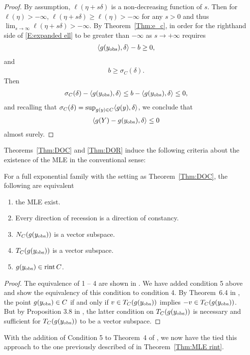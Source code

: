 \begin{proof}
By assumption, $\ell(\eta + s\delta)$ is a non-decreasing function of $s$.  
Then for $\ell(\eta ) > -\infty$, $\ell(\eta + s\delta) \geq \ell(\eta )  > -\infty$
for any $s>0$ and thus $\lim_{s \to \infty} \ell(\eta+s\delta) > -\infty$.
By Theorem~\ref{Thm:e_c}, in order for the righthand side of \eqref{E:expanded ell} 
to be greater than $-\infty$ as $s \to +\infty$ requires
\begin{align*}
	\langle g(y_{\text{obs}}), \delta \rangle - b \geq 0,
\end{align*}
and
\begin{align*}
	b \geq \sigma_C(\delta). %
\end{align*}
Then
\begin{align*}
	\sigma_C(\delta)  - \langle g(y_{\text{obs}}), \delta \rangle \leq b - \langle g(y_{\text{obs}}), \delta \rangle  \leq 0,
\end{align*}
and recalling that $\sigma_C(\delta) = \sup_{g(y) \in C} \langle g(y), \delta \rangle$, 
we conclude that
\begin{align*}
	\langle g(Y) - g(y_{\text{obs}}),\delta  \rangle \leq 0
\end{align*}
almost surely.
\end{proof}

Theorems~\ref{Thm:DOC} and \ref{Thm:DOR} induce the following criteria about the
existence of the MLE in the conventional sense:

\begin{theorem} \label{Thm:MLE existence}
For a full exponential family with the setting as Theorem~\ref{Thm:DOC}, the 
following are equivalent 
\begin{enumerate}
\item the MLE exist.
\item Every direction of recession is a direction of constancy.
\item $N_C(g(y_{\text{obs}}))$ is a vector subspace.
\item $T_C(g(y_{\text{obs}}))$ is a vector subspace.
\item $g(y_{\text{obs}}) \in \operatorname{rint} C$.
\end{enumerate}
\end{theorem}
\begin{proof}
The equivalence of 1 -- 4 are shown in \citep{Geyer:gdor}.  We have added condition 5 above
and show the equivalency of this condition to condition 4.  By Theorem~6.4 in \citep{Rockafellar:1970}, the point $g(y_{\text{obs}}) \in C$ if and only if $v \in T_C(g(y_{\text{obs}}))$ implies
$-v \in T_C(g(y_{\text{obs}}))$.  But by Proposition 3.8 in \citep{Rockafellar}, the latter condition
on  $T_C(g(y_{\text{obs}}))$ is necessary and sufficient for  $T_C(g(y_{\text{obs}}))$ to be a vector subspace.
\end{proof}
With the addition of Condition 5 to Theorem~4 of \citep{Geyer:gdor}, we now have the 
tied this approach to the one previously described of \citep{Barndorff} in Theorem~\ref{Thm:MLE rint}.

